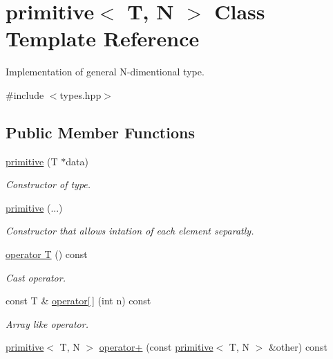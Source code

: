 \hypertarget{classprimitive}{}\section{primitive$<$ T, N $>$ Class Template Reference}
\label{classprimitive}


Implementation of general N-\/dimentional type.  




{\ttfamily \#include $<$types.\+hpp$>$}

\subsection*{Public Member Functions}
\begin{DoxyCompactItemize}
\item 
\hyperlink{classprimitive_aa6d523d4980e21bfa1dd61dbef4e9410}{primitive} (T $\ast$data)
\begin{DoxyCompactList}\small\item\em Constructor of type. \end{DoxyCompactList}\item 
\hypertarget{classprimitive_a07fc923d4a50ccf8765ddad066bd39f1}{}\hyperlink{classprimitive_a07fc923d4a50ccf8765ddad066bd39f1}{primitive} (...)\label{classprimitive_a07fc923d4a50ccf8765ddad066bd39f1}

\begin{DoxyCompactList}\small\item\em Constructor that allows intation of each element separatly. \end{DoxyCompactList}\item 
\hypertarget{classprimitive_a5d433bc57ad99a4922fed327ccaa9dc1}{}\hyperlink{classprimitive_a5d433bc57ad99a4922fed327ccaa9dc1}{operator T} () const \label{classprimitive_a5d433bc57ad99a4922fed327ccaa9dc1}

\begin{DoxyCompactList}\small\item\em Cast operator. \end{DoxyCompactList}\item 
\hypertarget{classprimitive_a895eafeee2d86791fe1f1535cd9a4d6f}{}const T \& \hyperlink{classprimitive_a895eafeee2d86791fe1f1535cd9a4d6f}{operator\mbox{[}$\,$\mbox{]}} (int n) const \label{classprimitive_a895eafeee2d86791fe1f1535cd9a4d6f}

\begin{DoxyCompactList}\small\item\em Array like operator. \end{DoxyCompactList}\item 
\hypertarget{classprimitive_aadc4f834ecc9a3522ed0bea1cf55b703}{}\hyperlink{classprimitive}{primitive}$<$ T, N $>$ \hyperlink{classprimitive_aadc4f834ecc9a3522ed0bea1cf55b703}{operator+} (const \hyperlink{classprimitive}{primitive}$<$ T, N $>$ \&other) const \label{classprimitive_aadc4f834ecc9a3522ed0bea1cf55b703}


\end{DoxyCompactItemize}
